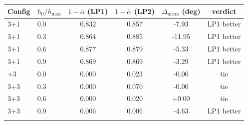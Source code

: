 \begin{tabular}{llcccc}
\toprule
Config & $h_0/h_{\max}$ & $1-\bar\alpha$ (LP1) & $1-\bar\alpha$ (LP2) & $\Delta_{\text{mean}}$ (deg) & verdict \\
\midrule
3+1 & 0.0 & 0.832 & 0.857 & -7.93 & LP1 better \\
3+1 & 0.3 & 0.864 & 0.885 & -11.95 & LP1 better \\
3+1 & 0.6 & 0.877 & 0.879 & -5.33 & LP1 better \\
3+1 & 0.9 & 0.869 & 0.869 & -3.29 & LP1 better \\
\addlinespace
3+3 & 0.0 & 0.000 & 0.023 & -0.00 & tie \\
3+3 & 0.3 & 0.000 & 0.070 & -0.00 & tie \\
3+3 & 0.6 & 0.000 & 0.020 & +0.00 & tie \\
3+3 & 0.9 & 0.006 & 0.006 & -4.63 & LP1 better \\
\addlinespace
\bottomrule
\end{tabular}
